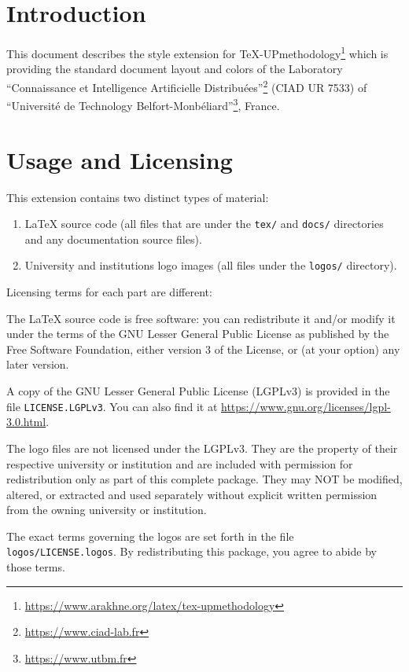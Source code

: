 \documentclass[english,article,nodocrefonfront,nodocrefonback]{utbmciadreport}
\begin{document}
\section{Introduction}

This document describes the style extension for TeX-UPmethodology\footnote{\url{https://www.arakhne.org/latex/tex-upmethodology}} which is providing the standard document layout and colors of the Laboratory ``Connaissance et Intelligence Artificielle Distribuées''\footnote{\url{https://www.ciad-lab.fr}} (CIAD UR 7533) of ``Université de Technology Belfort-Monbéliard''\footnote{\url{https://www.utbm.fr}}, France.


\section{Usage and Licensing}

This extension contains two distinct types of material:
\begin{enumerate}
\item LaTeX source code (all files that are under the \texttt{tex/} and \texttt{docs/} directories and any documentation source files).
\item University and institutions logo images (all files under the \texttt{logos/} directory).
\end{enumerate}

Licensing terms for each part are different:
\begin{enumdescription}
\item[LaTeX source code] The LaTeX source code is free software: you can redistribute it and/or modify it under the terms of the GNU Lesser General Public License as published by the Free Software Foundation, either version 3 of the License, or (at your option) any later version.

	A copy of the GNU Lesser General Public License (LGPLv3) is provided in the file \texttt{LICENSE.LGPLv3}.  You can also find it at \url{https://www.gnu.org/licenses/lgpl-3.0.html}.
\item[University and institution logos] The logo files are not licensed under the LGPLv3. They are the property of their respective university or institution and are included with permission for redistribution only as part of this complete package. They may NOT be modified, altered, or extracted and used separately without explicit written permission from the owning university or institution.

	The exact terms governing the logos are set forth in the file \texttt{logos/LICENSE.logos}. By redistributing this package, you agree to abide by those terms.
\end{enumdescription}
\end{document}
